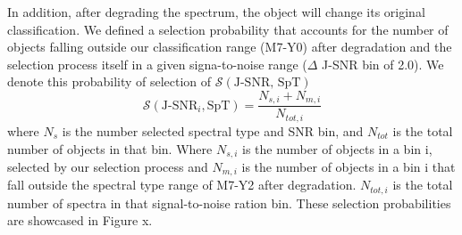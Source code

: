 \documentclass[manuscript]{aastex63}
\begin{document}
In addition, after degrading the spectrum, the object will change its original classification. We defined a selection probability that accounts for the number of objects falling outside our classification range (M7-Y0) after degradation and the selection process itself in a given signa-to-noise range ($\Delta$ J-SNR bin of 2.0). We denote this probability of selection of $\mathcal{S}(\text{J-SNR, SpT})$
\begin{equation}\label{equasl}
\mathcal{S}(\text{J-SNR}_i, \text{SpT})= \frac{N_{s, i} +N_{m, i}}{N_{tot, i}}
\end{equation} where $N_s$ is the number selected spectral type and SNR bin, and $N_{tot}$ is the total number of objects in that bin. Where $N_{s, i}$ is the number of objects in a bin i, selected by our selection process and $N_{m, i}$ is the number of objects in a bin i that fall outside the spectral type range of M7-Y2 after degradation. $N_{tot, i}$ is the total number of spectra in that signal-to-noise ration bin. These selection probabilities are showcased in Figure x.
\end{document}
